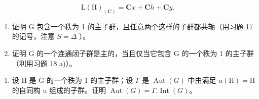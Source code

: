 \[
\mathrm{L} (\mathrm{H}) _ {(\mathbf {C})} = \mathbf {C} x + \mathbf {C} h + \mathbf {C} y.
\]

\begin{enumerate}
\def\labelenumi{\alph{enumi})}
\setcounter{enumi}{1}
\item
  证明 G 包含一个秩为 1 的主子群，且任意两个这样的子群都共轭（用习题 17 的记号，注意 \(S = \Delta\) ）。
\item
  证明 G 的一个连通闭子群是主的，当且仅当它包含 G 的一个秩为 1 的主子群（利用习题 18 a)）。
\end{enumerate}

\begin{enumerate}
\def\labelenumi{\arabic{enumi})}
\setcounter{enumi}{21}
\item
  设 H 是 G 的一个秩为 1 的主子群；设 \(\Gamma\) 是 \(\operatorname{Aut}(G)\) 中由满足 \(u(\mathrm{H}) = \mathrm{H}\) 的自同构 u 组成的子群。证明 \(\operatorname{Aut}(G) = \Gamma.\operatorname{Int}(G)\)。
\end{enumerate}

